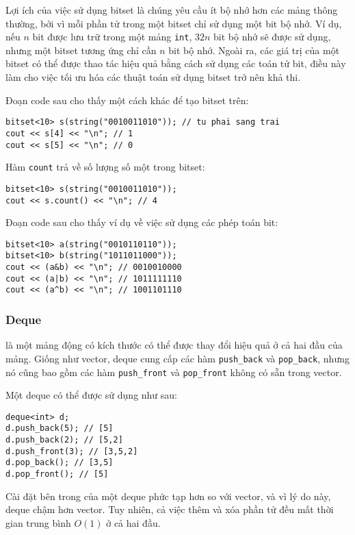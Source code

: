 Lợi ích của việc sử dụng bitset là
chúng yêu cầu ít bộ nhớ hơn các mảng thông thường,
bởi vì mỗi phần tử trong một bitset chỉ
sử dụng một bit bộ nhớ.
Ví dụ,
nếu $n$ bit được lưu trữ trong một mảng \texttt{int},
$32n$ bit bộ nhớ sẽ được sử dụng,
nhưng một bitset tương ứng chỉ cần $n$ bit bộ nhớ.
Ngoài ra, các giá trị của một bitset
có thể được thao tác hiệu quả bằng cách sử dụng
các toán tử bit, điều này làm cho việc
tối ưu hóa các thuật toán sử dụng bitset trở nên khả thi.

Đoạn code sau cho thấy một cách khác để tạo bitset trên:
\begin{lstlisting}
bitset<10> s(string("0010011010")); // tu phai sang trai
cout << s[4] << "\n"; // 1
cout << s[5] << "\n"; // 0
\end{lstlisting}

Hàm \texttt{count} trả về số lượng
số một trong bitset:

\begin{lstlisting}
bitset<10> s(string("0010011010"));
cout << s.count() << "\n"; // 4
\end{lstlisting}

Đoạn code sau cho thấy ví dụ về việc sử dụng các phép toán bit:
\begin{lstlisting}
bitset<10> a(string("0010110110"));
bitset<10> b(string("1011011000"));
cout << (a&b) << "\n"; // 0010010000
cout << (a|b) << "\n"; // 1011111110
cout << (a^b) << "\n"; // 1001101110
\end{lstlisting}

\subsubsection{Deque}


 là một mảng động
có kích thước có thể được thay đổi hiệu quả
ở cả hai đầu của mảng.
Giống như vector, deque cung cấp các hàm
\texttt{push\_back} và \texttt{pop\_back}, nhưng
nó cũng bao gồm các hàm
\texttt{push\_front} và \texttt{pop\_front}
không có sẵn trong vector.

Một deque có thể được sử dụng như sau:
\begin{lstlisting}
deque<int> d;
d.push_back(5); // [5]
d.push_back(2); // [5,2]
d.push_front(3); // [3,5,2]
d.pop_back(); // [3,5]
d.pop_front(); // [5]
\end{lstlisting}

Cài đặt bên trong của một deque
phức tạp hơn so với vector,
và vì lý do này, deque chậm hơn vector.
Tuy nhiên, cả việc thêm và xóa
phần tử đều mất thời gian trung bình $O(1)$ ở cả hai đầu.

